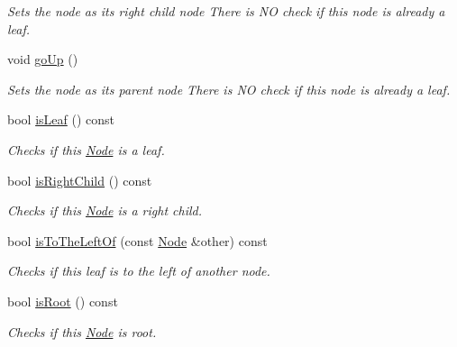 \begin{DoxyCompactItemize}
\begin{DoxyCompactList}\small\item\em Sets the node as its right child node There is NO check if this node is already a leaf. \item\end{DoxyCompactList}\item 
\hypertarget{class_complete_binary_tree_1_1_node_a8e56c20e8435282f3d9f2e6fbe0eb547}{
void \hyperlink{class_complete_binary_tree_1_1_node_a8e56c20e8435282f3d9f2e6fbe0eb547}{goUp} ()}
\label{class_complete_binary_tree_1_1_node_a8e56c20e8435282f3d9f2e6fbe0eb547}

\begin{DoxyCompactList}\small\item\em Sets the node as its parent node There is NO check if this node is already a leaf. \item\end{DoxyCompactList}\item 
bool \hyperlink{class_complete_binary_tree_1_1_node_addeecc7b908df78a88f1e2b897b39d10}{isLeaf} () const 
\begin{DoxyCompactList}\small\item\em Checks if this \hyperlink{class_complete_binary_tree_1_1_node}{Node} is a leaf. \item\end{DoxyCompactList}\item 
bool \hyperlink{class_complete_binary_tree_1_1_node_ae30f3348baf8149b733d6d6a022d7543}{isRightChild} () const 
\begin{DoxyCompactList}\small\item\em Checks if this \hyperlink{class_complete_binary_tree_1_1_node}{Node} is a right child. \item\end{DoxyCompactList}\item 
bool \hyperlink{class_complete_binary_tree_1_1_node_abd6c532c0fead0a2a1b014973d6208d1}{isToTheLeftOf} (const \hyperlink{class_complete_binary_tree_1_1_node}{Node} \&other) const 
\begin{DoxyCompactList}\small\item\em Checks if this leaf is to the left of another node. \item\end{DoxyCompactList}\item 
bool \hyperlink{class_complete_binary_tree_1_1_node_aaa1aa1b75088f1d923b16405d8ef171c}{isRoot} () const 
\begin{DoxyCompactList}\small\item\em Checks if this \hyperlink{class_complete_binary_tree_1_1_node}{Node} is root. \item\end{DoxyCompactList}\item 

\end{DoxyCompactItemize}
